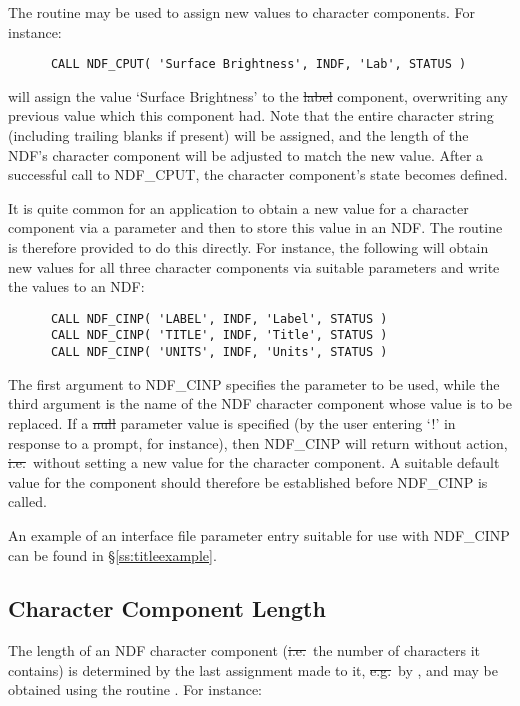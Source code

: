 The routine  may be used to assign new values to character
components. 
For instance:

\small
\begin{verbatim}
      CALL NDF_CPUT( 'Surface Brightness', INDF, 'Lab', STATUS )
\end{verbatim}
\normalsize

will assign the value `Surface Brightness' to the \st{label\/} component, 
overwriting any previous value which this component had.
Note that the entire character string (including trailing blanks if present)
will be assigned, and the length of the NDF's character component will be
adjusted to match the new value. 
After a successful call to NDF\_CPUT, the character component's state 
becomes defined.

It is quite common for an application to obtain a new value for a
character component via a parameter and then to store this value in an
NDF.
The routine  is therefore provided to do this directly.  For
instance, the following will obtain new values for all three character
components via suitable parameters and write the values to an NDF:

\small
\begin{verbatim}
      CALL NDF_CINP( 'LABEL', INDF, 'Label', STATUS )
      CALL NDF_CINP( 'TITLE', INDF, 'Title', STATUS )
      CALL NDF_CINP( 'UNITS', INDF, 'Units', STATUS )
\end{verbatim}
\normalsize

The first argument to NDF\_CINP specifies the parameter to be used, while
the third argument is the name of the NDF character component whose value is to
be replaced. 
If a \st{null\/} parameter value is specified (by the user entering `!' in
response to a prompt, for instance), then NDF\_CINP will return without
action, \st{i.e.}\ without setting a new value for the character component. 
A suitable default value for the component should therefore be established
before NDF\_CINP is called. 

An example of an  interface file parameter entry
suitable for use with
NDF\_CINP can be found in \S\ref{ss:titleexample}.

\subsection{Character Component Length}

The length of an NDF character component (\st{i.e.}\ the number of
characters it contains) is determined by the last assignment made to it,
\st{e.g.}\ by , and may be obtained using the routine . 
For instance:

